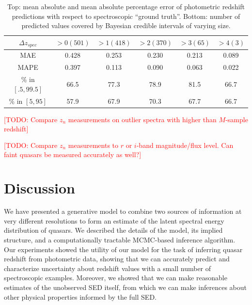 \documentclass{article}
\newcommand{\red}[1]{\textcolor{red}{[TODO: #1]}}
\begin{document}
\begin{table}[ht]
\caption{Top: mean absolute and mean absolute percentage error of photometric redshift predictions with respect to spectroscopic ``ground truth''.  Bottom: number of predicted values covered by Bayesian credible intervals of varying size. }
\label{tab:error}
\vskip 0.15in
\begin{center}
\begin{small}
\begin{sc}
\begin{tabular*}{0.75\textwidth}{cccccc}
\hline
\abovespace\belowspace
  $\Delta z_{spec}$ &  $ > 0 (501)$ & $ > 1 (418)$ & $ > 2 (370)$ & $ > 3 (65)$ & $ > 4 (3)$ \\
\hline
\abovespace
MAE &  0.428 & 0.253 & 0.230 & 0.213 & 0.089 \\
MAPE &  0.397 & 0.113 & 0.090 & 0.063 & 0.022 \\
\hline
\% in $[.5, 99.5]$ &  66.5 & 77.3 & 78.9 & 81.5 & 66.7 \\
\% in $[5, 95]$    &  57.9 & 67.9 & 70.3 & 67.7 & 66.7 \\
\hline
\end{tabular*}
\end{sc}
\end{small}
\end{center}
\vskip -0.1in
\end{table}


\red{Compare $z_n$ measurements on outlier spectra with higher than $M$-sample redshift}

\red{Compare $z_n$ measurements to $r$ or $i$-band magnitude/flux level.  Can faint quasars be measured accurately as well?}

\section{Discussion}
We have presented a generative model to combine two sources of information at very different resolutions to form an estimate of the latent spectral energy distribution of quasars.  We described the details of the model, its implied structure, and a computationally tractable MCMC-based inference algorithm. 
Our experiments showed the utility of our model for the task of inferring quasar redshift from photometric data, showing that we can accurately predict and characterize uncertainty about redshift values with a small number of spectroscopic examples.  
Moreover, we showed that we can make reasonable estimates of the unobserved SED itself, from which we can make inferences about other physical properties informed by the full SED.  
 
\end{document}
